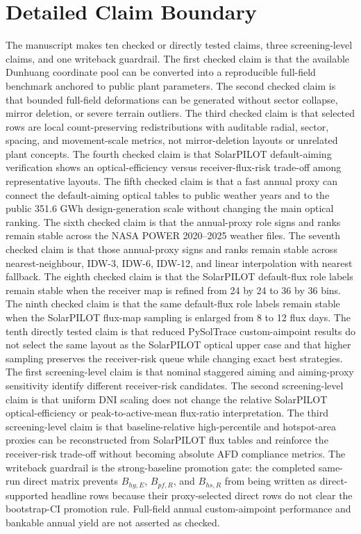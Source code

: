 \documentclass[final,3p,times]{elsarticle}
\begin{document}
\section{Detailed Claim Boundary}
The manuscript makes ten checked or directly tested claims, three screening-level claims, and one writeback guardrail. The first checked claim is that the available Dunhuang coordinate pool can be converted into a reproducible full-field benchmark anchored to public plant parameters. The second checked claim is that bounded full-field deformations can be generated without sector collapse, mirror deletion, or severe terrain outliers. The third checked claim is that selected rows are local count-preserving redistributions with auditable radial, sector, spacing, and movement-scale metrics, not mirror-deletion layouts or unrelated plant concepts. The fourth checked claim is that SolarPILOT default-aiming verification shows an optical-efficiency versus receiver-flux-risk trade-off among representative layouts. The fifth checked claim is that a fast annual proxy can connect the default-aiming optical tables to public weather years and to the public 351.6 GWh design-generation scale without changing the main optical ranking. The sixth checked claim is that the annual-proxy role signs and ranks remain stable across the NASA POWER 2020--2025 weather files. The seventh checked claim is that those annual-proxy signs and ranks remain stable across nearest-neighbour, IDW-3, IDW-6, IDW-12, and linear interpolation with nearest fallback. The eighth checked claim is that the SolarPILOT default-flux role labels remain stable when the receiver map is refined from 24 by 24 to 36 by 36 bins. The ninth checked claim is that the same default-flux role labels remain stable when the SolarPILOT flux-map sampling is enlarged from 8 to 12 flux days. The tenth directly tested claim is that reduced PySolTrace custom-aimpoint results do not select the same layout as the SolarPILOT optical upper case and that higher sampling preserves the receiver-risk queue while changing exact best strategies. The first screening-level claim is that nominal staggered aiming and aiming-proxy sensitivity identify different receiver-risk candidates. The second screening-level claim is that uniform DNI scaling does not change the relative SolarPILOT optical-efficiency or peak-to-active-mean flux-ratio interpretation. The third screening-level claim is that baseline-relative high-percentile and hotspot-area proxies can be reconstructed from SolarPILOT flux tables and reinforce the receiver-risk trade-off without becoming absolute AFD compliance metrics. The writeback guardrail is the strong-baseline promotion gate: the completed same-run direct matrix prevents $B_{hy,E}$, $B_{pf,R}$, and $B_{hs,R}$ from being written as direct-supported headline rows because their proxy-selected direct rows do not clear the bootstrap-CI promotion rule. Full-field annual custom-aimpoint performance and bankable annual yield are not asserted as checked.
\end{document}
